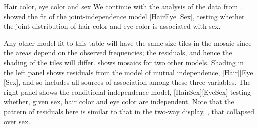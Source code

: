 \documentclass[11pt]{book}
\renewenvironment{knitrout}{\small\renewcommand{\baselinestretch}{.85}}{} %
\begin{document}

\begin{Example}[HEC2]{Hair color, eye color and sex}
We continue with the analysis of the  data from
.   showed the fit of the
joint-independence model [HairEye][Sex], testing whether
the joint distribution of hair color and eye color is
associated with sex.

Any other model fit to this table will have the same size tiles in the mosaic
since the areas depend on the observed frequencies;  the residuals,
and hence the shading of the tiles will differ.  
shows mosaics for two other models. Shading in the left panel shows 
residuals from the model of mutual independence, [Hair][Eye][Sex], and so
includes all sources of association among these three variables.
The right panel shows the
conditional independence model, [HairSex][EyeSex]
testing whether, given sex, hair color and eye color are independent.
Note that the pattern of residuals here is
similar to that in the two-way display,
, that collapsed over sex.

\begin{knitrout}
\color{fgcolor}\begin{kframe}
\begin{alltt}
 \hlkwb{<-} \hlstd{(}\hlstd{=}\hlstd{(}\hlstd{,} \hlstd{,} \hlstd{))}
  \hlstd{=} \hlopt{~}  \hlopt{+}  \hlopt{+}  
  \hlstd{=}\hlstd{)}
  \hlstd{=} \hlopt{~} \hlopt{*} \hlopt{+} \hlopt{*} 
        \hlstd{=}\hlstd{)}
\end{alltt}
\end{kframe}\begin{figure}[!htbp]



\end{figure}
\end{knitrout}
\end{Example}
\end{document}
